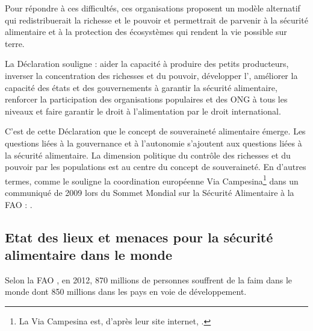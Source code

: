 Pour répondre à ces difficultés, ces organisations proposent un modèle alternatif  qui redistribuerait la richesse et le pouvoir et permettrait de parvenir à la sécurité alimentaire et à la protection des écosystèmes qui rendent la vie possible sur terre.

La Déclaration souligne  : 
aider la capacité à produire des petits producteurs, 
inverser la concentration des richesses et du pouvoir,
développer l'\agec,
améliorer la capacité des états et des gouvernements à garantir la sécurité alimentaire,
renforcer la participation des organisations populaires et des ONG à tous les niveaux
et faire garantir le droit à l'alimentation par le droit international.

C'est de cette Déclaration que le concept de souveraineté alimentaire émerge.
Les questions liées à la gouvernance et à l'autonomie s'ajoutent aux questions liées à la sécurité alimentaire.
La dimension politique du contrôle des richesses et du pouvoir par les populations est au centre du concept de souveraineté.
En d'autres termes, comme le souligne la coordination européenne Via Campesina\footnote{
La Via Campesina est, d'après leur site internet, .} dans un communiqué de 2009 lors du Sommet Mondial sur la Sécurité Alimentaire à la FAO :
.


\subsection{Etat des lieux et menaces pour la sécurité alimentaire dans le monde}
Selon la FAO \cite{fao_letat_2012}, en 2012, 870 millions de personnes souffrent de la faim dans le monde dont 850 millions dans les pays en voie de développement.


